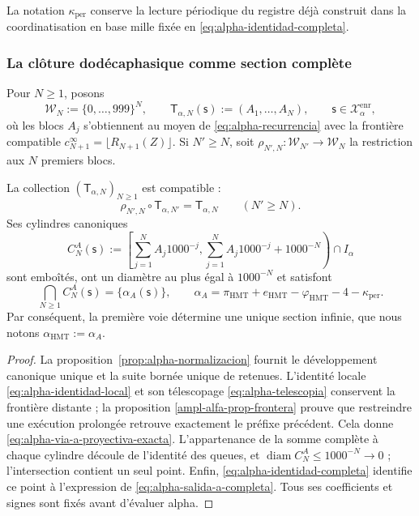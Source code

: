 La notation \(\kappa_{\mathrm{per}}\) conserve la lecture périodique du registre déjà construit dans la coordinatisation en base mille fixée en \eqref{eq:alpha-identidad-completa}.

\subsubsection{La clôture dodécaphasique comme section complète}

Pour \(N\geq1\), posons
\[
 \mathcal W_N:=\{0,\ldots,999\}^{N},
 \qquad
 \mathsf T_{\alpha,N}(\mathsf s):=(A_1,\ldots,A_N),
 \qquad \mathsf s\in\mathcal X_{\alpha}^{\mathrm{enr}},
\]
où les blocs \(A_j\) s'obtiennent au moyen de
\eqref{eq:alpha-recurrencia} avec la frontière compatible
\(c_{N+1}^{\infty}=\lfloor R_{N+1}(Z)\rfloor\). Si \(N'\geq N\), soit
\(\rho_{N',N}:\mathcal W_{N'}\to\mathcal W_N\) la restriction aux
\(N\) premiers blocs.

\begin{theorem}
\label{thm:alpha-salida-dodecafasica-completa}
La collection \((\mathsf T_{\alpha,N})_{N\geq1}\) est compatible :
\begin{equation}
 \rho_{N',N}\circ\mathsf T_{\alpha,N'}
 =\mathsf T_{\alpha,N}
 \qquad(N'\geq N).
 \label{eq:alpha-via-a-proyectiva-exacta}
\end{equation}
Ses cylindres canoniques
\begin{equation}
 C_N^A(\mathsf s):=
 \left[
  \sum_{j=1}^{N}A_j1000^{-j},
  \sum_{j=1}^{N}A_j1000^{-j}+1000^{-N}
 \right)\cap I_\alpha
 \label{eq:alpha-cilindros-via-a-exactos}
\end{equation}
sont emboîtés, ont un diamètre au plus égal à \(1000^{-N}\) et satisfont
\begin{equation}
 \bigcap_{N\geq1}C_N^A(\mathsf s)
 =\{\alpha_A(\mathsf s)\},
 \qquad
 \alpha_A
 =\pi_{\mathrm{HMT}}+e_{\mathrm{HMT}}-\varphi_{\mathrm{HMT}}
  -4-\kappa_{\mathrm{per}}.
 \label{eq:alpha-salida-a-completa}
\end{equation}
Par conséquent, la première voie détermine une unique section infinie, que
nous notons \(\alpha_{\mathrm{HMT}}:=\alpha_A\).
\end{theorem}

\begin{proof}
La proposition~\ref{prop:alpha-normalizacion} fournit le développement
canonique unique et la suite bornée unique de retenues. L’identité locale
\eqref{eq:alpha-identidad-local} et son télescopage
\eqref{eq:alpha-telescopia} conservent la frontière distante ; la proposition
\ref{ampl-alfa-prop-frontera} prouve que restreindre une exécution prolongée
retrouve exactement le préfixe précédent. Cela donne
\eqref{eq:alpha-via-a-proyectiva-exacta}. L’appartenance de la somme complète
à chaque cylindre découle de l’identité des queues, et
\(\operatorname{diam}C_N^A\leq1000^{-N}\to0\) ; l’intersection contient un
seul point. Enfin, \eqref{eq:alpha-identidad-completa} identifie ce
point à l’expression de \eqref{eq:alpha-salida-a-completa}. Tous ses
coefficients et signes sont fixés avant d’évaluer alpha.
\end{proof}

